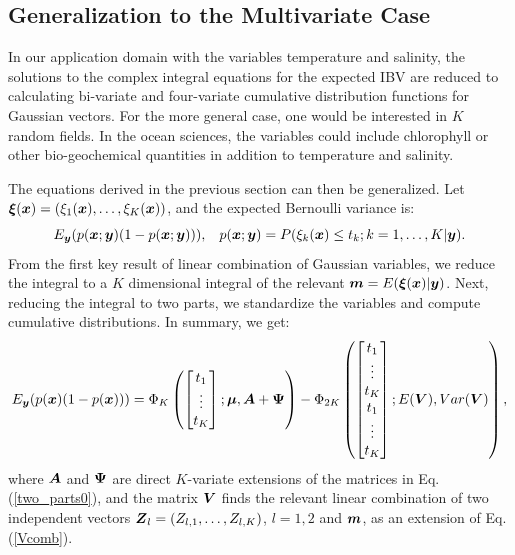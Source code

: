 \documentclass[aoas]{imsart}
\begin{document}
\subsection{Generalization to the Multivariate Case}
\label{gen_k}

In our application domain with the variables temperature and salinity,
the solutions to the complex integral equations for the expected IBV
are reduced to calculating bi-variate and four-variate cumulative
distribution functions for Gaussian vectors. For the more general
case, one would be interested in $K$ random fields. In the ocean
sciences, the variables could include chlorophyll or other
bio-geochemical quantities in addition to temperature and salinity.

The equations derived in the previous section can then be generalized. Let
${\boldsymbol \xi}({\boldsymbol x})=(\xi_1({\boldsymbol x}),\ldots,\xi_K({\boldsymbol x}))$, and the expected Bernoulli
variance is:
\begin{equation}\label{two_partsK}
E_{\by}(p(\bx;\by)(1-p(\bx;\by))), \hspace{3mm} p(\bx;\by)=P(\xi_k(\bx) \leq t_k ; k=1,\ldots,K|\by). 
\end{equation}
From the first key result of linear combination of Gaussian variables,
we reduce the integral to a $K$ dimensional integral of the relevant
${\boldsymbol m}=E({\boldsymbol \xi}({\boldsymbol x})|{\boldsymbol y})$. Next, reducing the integral to two parts, we
standardize the variables and compute cumulative distributions.  In
summary, we get:
\begin{equation}\label{two_parts}
E_{\by}(p(\bx)(1-p(\bx))) =  \Phi_K 
\begin{pmatrix}
\begin{bmatrix} t_1\\
\vdots \\
t_K 
\end{bmatrix};
\bmu,\bA+\bPsi 
\end{pmatrix}
- \Phi_{2K} 
\begin{pmatrix}
\begin{bmatrix} t_1\\
\vdots \\
t_K \\
t_1\\
\vdots \\
t_K 
\end{bmatrix};
E(\bV),Var(\bV) 
\end{pmatrix},\nonumber
\end{equation}
where ${\boldsymbol A}$ and ${\boldsymbol \Psi}$ are direct $K$-variate extensions of the
matrices in Eq. (\ref{two_parts0}), and the matrix ${\boldsymbol V}$ finds the
relevant linear combination of two independent vectors
${\boldsymbol Z}_l=(Z_{l,1},\ldots,Z_{l,K})$, $l=1,2$ and ${\boldsymbol m}$, as an extension
of Eq. (\ref{Vcomb}).
\end{document}
